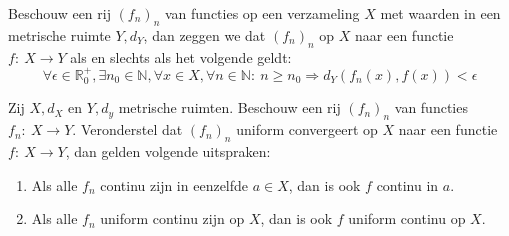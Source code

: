 \documentclass[main.tex]{subfiles}
\begin{document}
\begin{de}
  Beschouw een rij $(f_{n})_{n}$ van functies op een verzameling $X$ met waarden in een metrische ruimte $Y,d_{Y}$, dan zeggen we dat $(f_{n})_{n}$  op $X$ naar een functie $f:\ X \rightarrow Y$ als en slechts als het volgende geldt:
  \[ \forall \epsilon \in \mathbb{R}_{0}^{+}, \exists n_{0}\in \mathbb{N}, \forall x\in X, \forall n\in \mathbb{N}:\ n \ge n_{0} \Rightarrow d_{Y}(f_{n}(x),f(x)) < \epsilon \]
\end{de}

\begin{bst}
  Zij $X,d_{X}$ en $Y,d_{y}$ metrische ruimten.
  Beschouw een rij $(f_{n})_{n}$ van functies $f_{n}:\ X \rightarrow Y$.
  Veronderstel dat $(f_{n})_{n}$ uniform convergeert op $X$ naar een functie $f:\ X \rightarrow Y$, dan gelden volgende uitspraken:
  \begin{enumerate}
  \item Als alle $f_{n}$ continu zijn in eenzelfde $a\in X$, dan is ook $f$ continu in $a$.
  \item Als alle $f_{n}$ uniform continu zijn op $X$, dan is ook $f$ uniform continu op $X$.
  \end{enumerate}
\end{bst}
\end{document}

